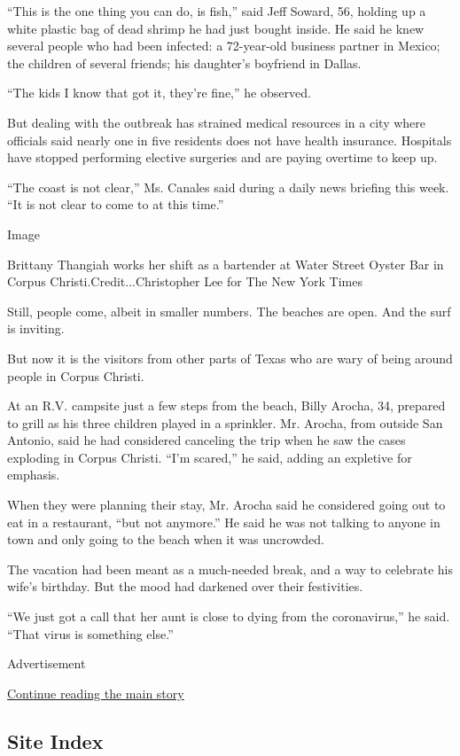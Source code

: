 ``This is the one thing you can do, is fish,'' said Jeff Soward, 56,
holding up a white plastic bag of dead shrimp he had just bought inside.
He said he knew several people who had been infected: a 72-year-old
business partner in Mexico; the children of several friends; his
daughter's boyfriend in Dallas.

``The kids I know that got it, they're fine,'' he observed.

But dealing with the outbreak has strained medical resources in a city
where officials said nearly one in five residents does not have health
insurance. Hospitals have stopped performing elective surgeries and are
paying overtime to keep up.

``The coast is not clear,'' Ms. Canales said during a daily news
briefing this week. ``It is not clear to come to at this time.''

Image

Brittany Thangiah works her shift as a bartender at Water Street Oyster
Bar in Corpus Christi.Credit...Christopher Lee for The New York Times

Still, people come, albeit in smaller numbers. The beaches are open. And
the surf is inviting.

But now it is the visitors from other parts of Texas who are wary of
being around people in Corpus Christi.

At an R.V. campsite just a few steps from the beach, Billy Arocha, 34,
prepared to grill as his three children played in a sprinkler. Mr.
Arocha, from outside San Antonio, said he had considered canceling the
trip when he saw the cases exploding in Corpus Christi. ``I'm scared,''
he said, adding an expletive for emphasis.

When they were planning their stay, Mr. Arocha said he considered going
out to eat in a restaurant, ``but not anymore.'' He said he was not
talking to anyone in town and only going to the beach when it was
uncrowded.

The vacation had been meant as a much-needed break, and a way to
celebrate his wife's birthday. But the mood had darkened over their
festivities.

``We just got a call that her aunt is close to dying from the
coronavirus,'' he said. ``That virus is something else.''

Advertisement

\protect\hyperlink{after-bottom}{Continue reading the main story}

\hypertarget{site-index}{%
\subsection{Site Index}\label{site-index}}

